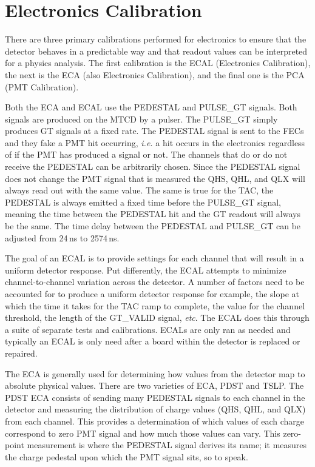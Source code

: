\section{Electronics Calibration}
There are three primary calibrations performed for electronics to ensure that the
detector behaves in a predictable way and that readout values can be interpreted
for a physics analysis. The first calibration is the ECAL (Electronics Calibration),
the next is the ECA (also Electronics Calibration), and the final one is the PCA (PMT
Calibration).

Both the ECA and ECAL use the PEDESTAL and PULSE\_GT signals. Both signals
are produced on the MTCD by a pulser.
The PULSE\_GT simply produces GT signals at a fixed rate.
The PEDESTAL signal is sent to the FECs and they fake a PMT hit occurring,
\textit{i.e.} a hit occurs in the electronics regardless of if the PMT has
produced a signal or not.
The channels that do or do not receive the PEDESTAL can be arbitrarily chosen.
Since the PEDESTAL signal does not change the PMT signal that is measured the
QHS, QHL, and QLX will always read out with the same value. The same is true
for the TAC, the PEDESTAL is always emitted a fixed time before the PULSE\_GT
signal, meaning the time between the PEDESTAL hit and the GT readout will always
be the same.
The time delay between the PEDESTAL and PULSE\_GT can be adjusted from
24\,ns to 2574\,ns.

The goal of an ECAL is to provide settings for each channel that will result in a uniform
detector response. Put differently, the ECAL attempts to minimize channel-to-channel variation
across the detector.
A number of factors need to be accounted for to produce a uniform detector response for example,
the slope at which the time it takes for the TAC ramp to complete, the value for the
channel threshold, the length of the GT\_VALID signal, \textit{etc}.
The ECAL does this through a suite of separate tests and calibrations.
ECALs are only ran as needed and typically an ECAL is only need after a board within the
detector is replaced or repaired.

The ECA is generally used for determining how values from the detector map to absolute
physical values.
There are two varieties of ECA,  PDST and  TSLP\@.
The PDST ECA consists of sending many PEDESTAL signals to each channel in the detector and
measuring the distribution of charge values (QHS, QHL, and QLX) from each channel.
This provides a determination of which values of each charge correspond to zero PMT
signal and how much those values can vary.
This zero-point measurement is where the PEDESTAL signal derives its name; it measures
the charge pedestal upon which the PMT signal sits, so to speak.

